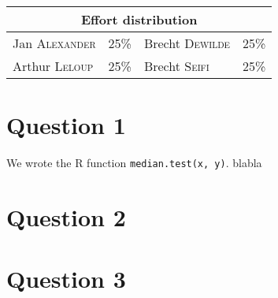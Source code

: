 \documentclass[12pt,letterpaper]{article}
\begin{document}
\begin{table}[h!]
\begin{tabular}{ lc|lc } 
\multicolumn{4}{c}{Effort distribution}\\
 \hline
 Jan \textsc{Alexander} & 25\% & Brecht \textsc{Dewilde} & 25\%\\ 
Arthur \textsc{Leloup} & 25\% & Brecht \textsc{Seifi} & 25\% \\ 
 \hline
\end{tabular}
\end{table}



\section*{Question 1}
We wrote the R function \texttt{median.test(x, y)}. blabla
        

        

\section*{Question 2}


\section*{Question 3}
\end{document}

